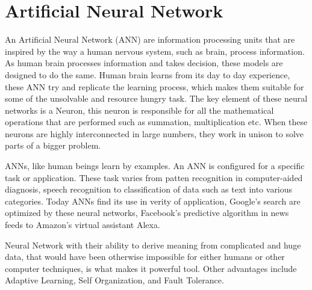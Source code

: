 \documentclass[12pt, a4paper]{report}
\begin{document}
\section{Artificial Neural Network}\label{ANN}
An Artificial Neural Network (ANN) are information processing units that are inspired by the way a human nervous system, such as brain, process information. As human brain processes information and takes decision, these models are designed to do the same. Human brain learns from its day to day experience, these ANN try and replicate the learning process, which makes them suitable for some of the unsolvable and resource hungry task. The key element of these neural networks is a Neuron, this neuron is responsible for all the mathematical operations that are performed such as summation, multiplication etc. When these neurons are highly interconnected in large numbers, they work in unison to solve parts of a bigger problem.\\ \par

ANNs, like human beings learn by examples. An ANN is configured for a specific task or application. These task varies from patten recognition in computer-aided diagnosis, speech recognition to classification of data such as text into various categories. Today ANNs find its use in verity of application, Google's search are optimized by these neural networks, Facebook's predictive algorithm in news feeds to Amazon's virtual assistant Alexa. \\ \par

Neural Network with their ability to derive meaning from complicated and huge data, that would have been otherwise impossible for either humans or other computer techniques, is what makes it powerful tool. Other advantages include Adaptive Learning, Self Organization, and Fault Tolerance.\\ \par
\end{document}
